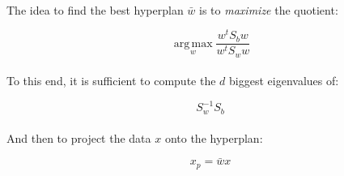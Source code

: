 \paragraph{}
The idea to find the best hyperplan $\bar{w}$ is to \emph{maximize} the quotient:

\begin{equation*}
\boxed{\operatorname*{arg\,max}_w \frac{w^tS_bw}{w^tS_ww}}
\end{equation*}

\paragraph{}
To this end, it is sufficient to compute the $d$ biggest eigenvalues of:

\begin{equation*}
S_w^{-1}S_b
\end{equation*}

\paragraph{}
And then to project the data $x$ onto the hyperplan:

\begin{equation*}
x_p = \bar{w}x
\end{equation*}